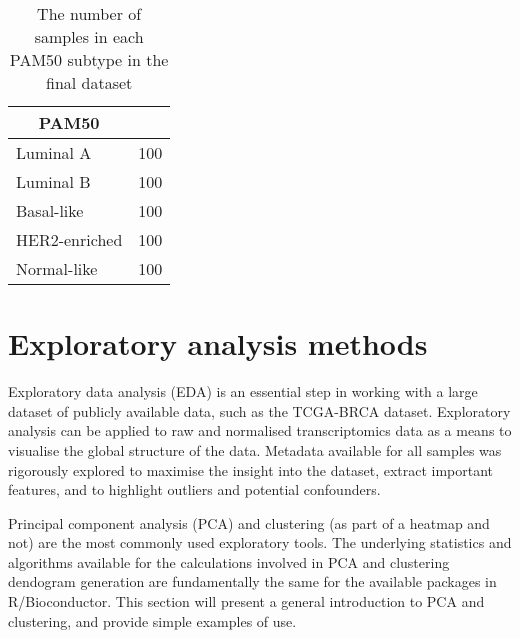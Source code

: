     
                \begin{table}[!htbp]
                \centering
                \caption{The number of samples in each PAM50 subtype in the final dataset}
                \label{table:pam50counts}
                \begin{tabular}{ll}
                \multicolumn{1}{c}{\textbf{PAM50}} &  \\ \hline
                \multicolumn{1}{|l|}{Luminal A} & \multicolumn{1}{l|}{100} \\ \hline
                \multicolumn{1}{|l|}{Luminal B} & \multicolumn{1}{l|}{100} \\ \hline
                \multicolumn{1}{|l|}{Basal-like} & \multicolumn{1}{l|}{100} \\ \hline
                \multicolumn{1}{|l|}{HER2-enriched} & \multicolumn{1}{l|}{100} \\ \hline
                \multicolumn{1}{|l|}{Normal-like} & \multicolumn{1}{l|}{100} \\ \hline
                \end{tabular}
                \end{table}
                
    
    
    
\section{Exploratory analysis methods}
    
    Exploratory data analysis (EDA) is an essential step in working with a large dataset of publicly available data, such as the TCGA-BRCA dataset. Exploratory analysis can be applied to raw and normalised transcriptomics data as a means to visualise the global structure of the data. Metadata available for all samples was rigorously explored to maximise the insight into the dataset, extract important features, and to highlight outliers and potential confounders.
    
    Principal component analysis (PCA) and clustering (as part of a heatmap and not) are the most commonly used exploratory tools. The underlying statistics and algorithms available for the calculations involved in PCA and clustering dendogram generation are fundamentally the same for the available packages in R/Bioconductor. This section will present a general introduction to PCA and clustering, and provide simple examples of use.

